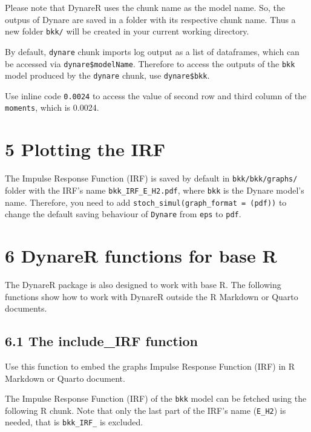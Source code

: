\documentclass[
  letterpaper,
  DIV=11,
  numbers=noendperiod]{scrartcl}
\begin{document}
Please note that DynareR uses the chunk name as the model name. So, the
outpus of Dynare are saved in a folder with its respective chunk name.
Thus a new folder \texttt{bkk/} will be created in your current working
directory.

By default, \texttt{dynare} chunk imports log output as a list of
dataframes, which can be accessed via \texttt{dynare\$modelName}.
Therefore to access the outputs of the \texttt{bkk} model produced by
the \texttt{dynare} chunk, use \texttt{dynare\$bkk}.

Use inline code \texttt{0.0024} to access the value of second row and
third column of the \texttt{moments}, which is 0.0024.

\hypertarget{plotting-the-irf}{%
\section{5 Plotting the IRF}\label{plotting-the-irf}}

The Impulse Response Function (IRF) is saved by default in
\texttt{bkk/bkk/graphs/} folder with the IRF's name
\texttt{bkk\_IRF\_E\_H2.pdf}, where \texttt{bkk} is the Dynare model's
name. Therefore, you need to add
\texttt{stoch\_simul(graph\_format\ =\ (pdf))} to change the default
saving behaviour of \texttt{Dynare} from \texttt{eps} to \texttt{pdf}.

\hypertarget{dynarer-functions-for-base-r}{%
\section{6 DynareR functions for base
R}\label{dynarer-functions-for-base-r}}

The DynareR package is also designed to work with base R. The following
functions show how to work with DynareR outside the R Markdown or Quarto
documents.

\hypertarget{the-include_irf-function}{%
\subsection{6.1 The include\_IRF
function}\label{the-include_irf-function}}

Use this function to embed the graphs Impulse Response Function (IRF) in
R Markdown or Quarto document.

The Impulse Response Function (IRF) of the \texttt{bkk} model can be
fetched using the following R chunk. Note that only the last part of the
IRF's name (\texttt{E\_H2}) is needed, that is \texttt{bkk\_IRF\_} is
excluded.
\end{document}
